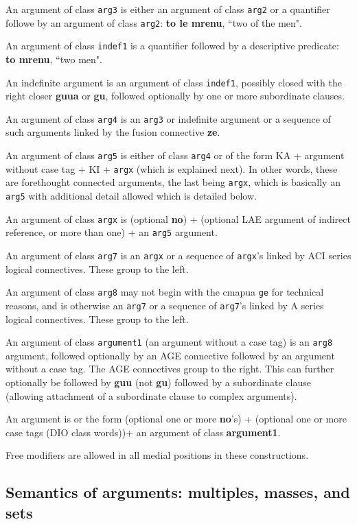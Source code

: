 \documentclass[12pt]{book}
\begin{document}
An argument of class {\tt arg3} is either an argument of class {\tt arg2} or a quantifier followe by an argument of class {\tt arg2}:
{\bf to le mrenu}, ``two of the men".

An argument of class {\tt indef1} is a quantifier followed by a descriptive predicate:  {\bf to mrenu}, ``two men".

An indefinite argument is an argument of class {\tt indef1}, possibly closed with the right closer {\bf guua} or {\bf gu}, followed optionally by one or more subordinate clauses.

An argument of class {\tt arg4} is an {\tt arg3} or indefinite argument or a sequence of such arguments linked by the fusion connective {\bf ze}.

An argument of class {\tt arg5} is either of class {\tt arg4} or of the form KA + argument without case tag + KI + {\tt argx} (which is explained next).  In other words, these are forethought connected arguments, the last being {\tt argx}, which is basically an {\tt arg5} with additional detail allowed which is detailed below.

An argument of class {\tt argx} is (optional {\bf no}) + (optional LAE argument of indirect reference, or more than one) + an {\tt arg5} argument.

An argument of class {\tt arg7} is an {\tt argx} or a sequence of {\tt argx}'s linked by ACI series logical connectives.  These group to the left.

An argument of class {\tt arg8} may not begin with the cmapua {\tt ge} for technical reasons, and is otherwise an {\tt arg7} or a sequence
of {\tt arg7}'s linked by A series logical connectives.  These group to the left.

An argument of class {\tt argument1} (an argument without a case tag) is an {\tt arg8} argument, followed optionally by an AGE connective followed by an argument without a case tag.  The AGE connectives group to the right.  This can further optionally be followed by {\bf guu} (not {\bf gu}) followed by a subordinate clause (allowing attachment of a subordinate clause to complex arguments).  

An argument is or the form (optional one or more {\bf no}'s) + (optional one or more case tags (DIO class words))+ an argument of class {\bf argument1}.

Free modifiers are allowed in all medial positions in these constructions.

\subsection{Semantics of arguments:  multiples, masses, and sets}
\end{document}
